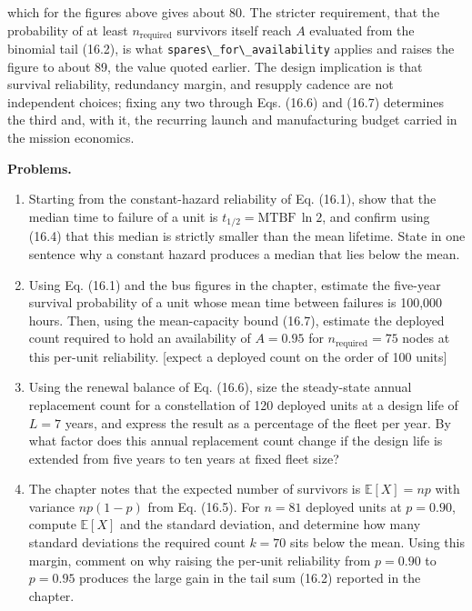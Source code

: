\documentclass[
  11pt,
  openany,
  oneside]{book}
\newcommand{\passthrough}[1]{#1}
\begin{document}
which for the figures above gives about 80. The stricter requirement,
that the probability of at least \(n_{\mathrm{required}}\) survivors
itself reach \(A\) evaluated from the binomial tail (16.2), is what
\passthrough{\lstinline!spares\_for\_availability!} applies and raises
the figure to about 89, the value quoted earlier. The design implication
is that survival reliability, redundancy margin, and resupply cadence
are not independent choices; fixing any two through Eqs. (16.6) and
(16.7) determines the third and, with it, the recurring launch and
manufacturing budget carried in the mission economics.

\textbf{Problems.}

\begin{enumerate}
\def\labelenumi{\arabic{enumi}.}
\item
  Starting from the constant-hazard reliability of Eq. (16.1), show that
  the median time to failure of a unit is
  \(t_{1/2} = \mathrm{MTBF}\,\ln 2\), and confirm using (16.4) that this
  median is strictly smaller than the mean lifetime. State in one
  sentence why a constant hazard produces a median that lies below the
  mean.
\item
  Using Eq. (16.1) and the bus figures in the chapter, estimate the
  five-year survival probability of a unit whose mean time between
  failures is 100,000 hours. Then, using the mean-capacity bound (16.7),
  estimate the deployed count required to hold an availability of
  \(A = 0.95\) for \(n_{\mathrm{required}} = 75\) nodes at this per-unit
  reliability. {[}expect a deployed count on the order of 100 units{]}
\item
  Using the renewal balance of Eq. (16.6), size the steady-state annual
  replacement count for a constellation of 120 deployed units at a
  design life of \(L = 7\) years, and express the result as a percentage
  of the fleet per year. By what factor does this annual replacement
  count change if the design life is extended from five years to ten
  years at fixed fleet size?
\item
  The chapter notes that the expected number of survivors is
  \(\mathbb{E}[X] = np\) with variance \(np(1-p)\) from Eq. (16.5). For
  \(n = 81\) deployed units at \(p = 0.90\), compute \(\mathbb{E}[X]\)
  and the standard deviation, and determine how many standard deviations
  the required count \(k = 70\) sits below the mean. Using this margin,
  comment on why raising the per-unit reliability from \(p = 0.90\) to
  \(p = 0.95\) produces the large gain in the tail sum (16.2) reported
  in the chapter.
\end{enumerate}
\end{document}
